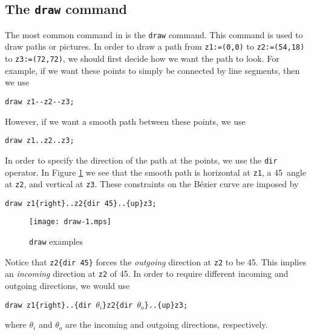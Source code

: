 \subsection{The \texttt{draw} command}

The most common command in \MP{} is the \texttt{draw} command.  This
command is used to draw paths or pictures.  In order to draw a path from
\texttt{z1:=(0,0)} to \texttt{z2:=(54,18)} to \texttt{z3:=(72,72)}, we
should first decide how we want the path to look.  For example, if we
want these points to simply be connected by line segments, then we
use

\begin{center}
  \verb|draw z1--z2--z3;|
\end{center}

However, if we want a smooth path between these points, we use

\begin{center}
  \verb|draw z1..z2..z3;|
\end{center}

In order to specify the direction of the path at the points, we use the
\texttt{dir} operator.  In Figure \ref{fig:draw1} we see that the smooth
path is horizontal at \texttt{z1}, a 45\textdegree\ angle at
\texttt{z2}, and vertical at \texttt{z3}.  These constraints on the
B\'{e}zier curve are imposed by

\begin{center}
  \verb|draw z1{right}..z2{dir 45}..{up}z3;|
\end{center}

\begin{figure}
  \centering
  \texttt{[image: draw-1.mps]}
  \caption{\texttt{draw} examples}
  \label{fig:draw1}
\end{figure}

Notice that \verb|z2{dir 45}| forces the \textit{outgoing} direction at
\texttt{z2} to be 45\textdegree.  This implies an \textit{incoming}
direction at \texttt{z2} of 45\textdegree.  In order to require
different incoming and outgoing directions, we would use

\begin{center}
  \verb|draw z1{right}..{dir |$\theta_i$\verb|}z2{dir |$\theta_o$\verb|}..{up}z3;|
\end{center}

where $\theta_i$ and $\theta_o$ are the incoming and outgoing
directions, respectively.
